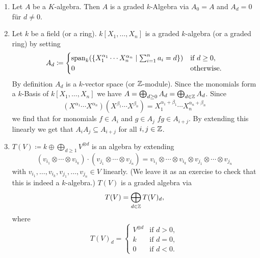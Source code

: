 \begin{expls}
  \begin{enumerate}[label=\emph{\alph*)},leftmargin=*]
    \item
      Let $A$ be a $K$-algebra.
      Then $A$ is a graded $k$-Algebra via $A_0 = A$ and $A_d = 0$ für $d \neq 0$.
    \item
      Let $k$ be a field (or a ring).
      $k[X_1, \dotsc, X_n]$ is a graded $k$-algebra (or a graded ring) by setting
      \[
                  A_d
        \coloneqq \begin{cases}
                    \operatorname{span}_k(
                              \{X_1^{\alpha_1} \dotsm X_n^{\alpha_n}
                            \mid
                              \sum_{i=1}^n a_i = d\}
                            )
                            & \text{if } d \geq 0, \\
                    0       & \text{otherwise}.
                  \end{cases}
      \]
      By definition $A_d$ is a $k$-vector space (or $\mathbb{Z}$-module).
      Since the monomials form a $k$-Basis of $k[X_1, \dotsc, X_n]$ we have $A = \bigoplus_{d \geq 0} A_d = \bigoplus_{d \in \mathbb{Z}} A_d$.
      Since
      \[
          \left( X^{\alpha_1} \dotsm X^{\alpha_n} \right)
          \left( X^{\beta_1} \dotsm X^{\beta_n} \right)
        = X_1^{\alpha_1+\beta_1} \dotsm X_n^{\alpha_n+\beta_n}
      \]
      we find that for monomials $f \in A_i$ and $g \in A_j$ $fg \in A_{i+j}$.
      By extending this linearly we get that $A_i A_j \subseteq A_{i+j}$ for all $i,j \in \mathbb{Z}$.
    \item
      $T(V) \coloneqq k \oplus \bigoplus_{d \geq 1} V^{\otimes d}$ is an algebra by extending
      \[
          (v_{i_1} \otimes \dotsb \otimes v_{i_k}) \cdot (v_{j_1} \otimes \dotsb \otimes v_{j_n})
        = v_{i_1} \otimes \dotsb \otimes v_{i_k} \otimes v_{j_1} \otimes \dotsb \otimes v_{j_n}
      \]
      with $v_{i_1}, \dotsc, v_{i_k}, v_{j_1}, \dotsc, v_{j_n} \in V$ linearly.
      (We leave it as an exercise to check that this is indeed a $k$-algebra.)
      $T(V)$ is a graded algebra via
      \[
          T(V)
        = \bigoplus_{d \in \mathbb{Z}} T(V)_d,
      \]
      where
      \[
          T(V)_d
        = \begin{cases}
            V^{\otimes d} & \text{if } d > 0, \\
            k             & \text{if } d = 0, \\
            0             & \text{if } d < 0.
          \end{cases}
      \]
  \end{enumerate}
\end{expls}


